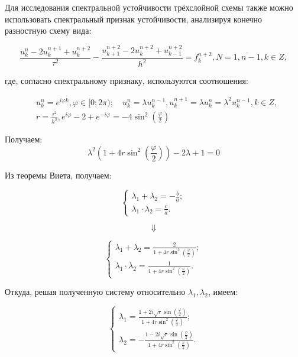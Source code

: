 \documentclass[14pt,a4paper]{scrartcl}
\begin{document}
Для исследования спектральной устойчивости трёхслойной схемы также можно использовать спектральный признак устойчивости, анализируя конечно разностную схему вида:

\begin{equation*}
	\frac{u_{k}^{n}-2 u_{k}^{n+1}+u_{k}^{n+2}}{\tau^{2}}-\frac{u_{k+1}^{n+2}-2 u_{k}^{n+2}+u_{k-1}^{n+2}}{h^{2}}=f_{k}^{n+2}, N=\overline{1, n-1}, k \in Z,
\end{equation*}

где, согласно спектральному признаку, используются соотношения:

\begin{align*}
	&u_{k}^{n}=e^{i \varphi k}, \varphi \in[0 ; 2 \pi) ; \quad u_{k}^{n}=\lambda u_{k}^{n-1}, u_{k}^{n+1}=\lambda u_{k}^{n}=\lambda^{2} u_{k}^{n-1}, k \in Z, \\
	&r=\frac{\tau^{2}}{h^{2}}, e^{i \varphi}-2+e^{-i \varphi}=-4 \sin ^{2}\left(\frac{\varphi}{2}\right)
\end{align*}


Получаем:
\begin{equation*}
	\lambda^{2}\left(1+4 r \sin ^{2}\left(\frac{\varphi}{2}\right)\right)-2 \lambda+1=0
\end{equation*}


Из теоремы Виета, получаем:

\begin{equation*}
	\left\{\begin{array}{l}
	\lambda_{1}+\lambda_{2}=-\frac{b}{a}; \\
	\lambda_{1} \cdot \lambda_{2}=\frac{c}{a}.
	\end{array}\right.
\end{equation*}

\begin{equation*}
	\Downarrow
\end{equation*}


\begin{equation*}
	\left\{\begin{array}{l}
	\lambda_{1}+\lambda_{2}=\frac{2}{1+4 r \sin ^{2}\left(\frac{\varphi}{2}\right)}; \\
	\lambda_{1} \cdot \lambda_{2}=\frac{1}{1+4 r \sin ^{2}\left(\frac{\varphi}{2}\right)}.
	\end{array}\right.
\end{equation*}

Откуда, решая полученную систему относительно $\lambda_{1}, \lambda_{2}$, имеем:

\begin{equation*}
	\left\{\begin{array}{l}
	\lambda_{1}=\frac{1+2 i \sqrt{r} \sin \left(\frac{\varphi}{2}\right)}{1+4 r \sin ^{2}\left(\frac{\varphi}{2}\right)}; \\
	\lambda_{2}=-\frac{1-2 i \sqrt{r} \sin \left(\frac{\varphi}{2}\right)}{1+4 r \sin ^{2}\left(\frac{\varphi}{2}\right)}.
	\end{array}\right.
\end{equation*}
\end{document}
